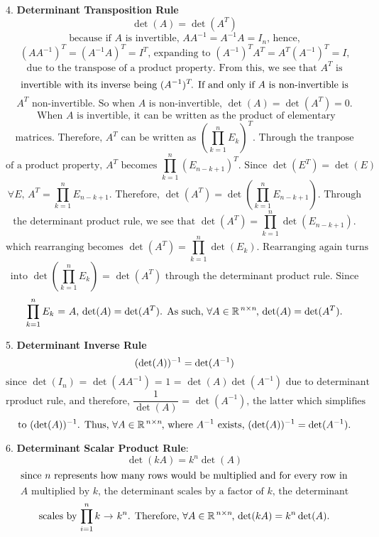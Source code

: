 \documentclass{article}
\begin{document}
4. \textbf{Determinant Transposition Rule}
\[
\text{$\det(A) = \det(A^T)$}
\]
\[
\text{because if $A$ is invertible, $AA^{-1} = A^{-1}A = I_n$, hence,}
\]
\[
\text{$(AA^{-1})^T = (A^{-1}A)^T = I^T$, expanding to $(A^{-1})^TA^T = A^T(A^{-1})^T = I$,}
\]
\[
\text{due to the transpose of a product property. From this, we see that $A^T$ is}
\]
\[
\text{invertible with its inverse being $(A^{-1})^T\hspace{-0.5mm}$. If and only if $A$ is non-invertible is}
\]
\[
\text{$A^T$ non-invertible. So when $A$ is non-invertible, $\det(A) = \det(A^T) = 0$.}
\]
\[
\text{ When $A$ is invertible, it can be written as the product of elementary}
\]
\[
\text{matrices. Therefore, $A^T$ can be written as $(\prod_{k=1}^{n} E_k)^T$. Through the tranpose}
\] 
\[
\text{of a product property, $A^T$ becomes $\prod_{k=1}^{n} (E_{n-k+1})^T$. Since $\det(E^T) = \det(E)$}
\]
\[
\text{$\forall E$, $A^T = \prod_{k=1}^{n} E_{n-k+1}$. Therefore, $\det(A^T) = \det(\prod_{k=1}^{n} E_{n-k+1})$. Through}
\]
\[
\text{the determinant product rule, we see that $\det(A^T) = \prod_{k=1}^{n} \det(E_{n-k+1})$.}
\]
\[
\text{which rearranging becomes $\det(A^T) = \prod_{k=1}^{n} \det(E_k)$. Rearranging again turns}
\]
\[
\text{into $\det(\prod_{k=1}^{n} E_k)$ = $\det(A^T)$ through the determinant product rule. Since}
\]
\[
\text{$\prod_{k=1}^{n} E_k$ = $A$, $\det(A) = \det(A^T)$. As such, $\forall A \in \mathbb{R}^{\hspace{0.5mm}n \times n}$ \hspace{-1.5mm}, $\det(A) = \det(A^T)$.}
\]
\vspace{1mm}

5. \textbf{Determinant Inverse Rule}
\[
\text{$(\det(A))^{-1} = \det(A^{-1})$}
\vspace{1mm}
\]
\[
\text{since $\det(I_n)$ = $\det(AA^{-1})$ = 1 = $\det(A)\det(A^{-1})$ due to determinant}
\]
\[
\text{rproduct rule, and therefore, $\frac{1}{\det(A)}$ = $\det(A^{-1})$, the latter which simplifies}
\]
\[
\text{to $(\det(A))^{-1}$. Thus, $\forall A \in \mathbb{R}^{\hspace{0.5mm}n \times n}$ \hspace{-1.5mm}, where $A^{-1}$ exists, $(\det(A))^{-1} = \det(A^{-1})$.}
\vspace{1mm}
\]

6. \textbf{Determinant Scalar Product Rule}:
\[
\det(kA) = k^n \det(A)
\]
\[
\text{since $n$ represents how many rows would be multiplied and for every row in}
\vspace{2mm}
\]
\[
\text{$A$ multiplied by $k$, the determinant scales by a factor of $k$, the determinant}
\]
\[
\text{scales by $\prod_{i=1}^n k$ $\rightarrow$ $k^n$. Therefore, $\forall A \in \mathbb{R}^{\hspace{0.5mm}n \times n}$ \hspace{-1.5mm}, $\det(kA) = k^n\det(A)$.}
\]
\end{document}
